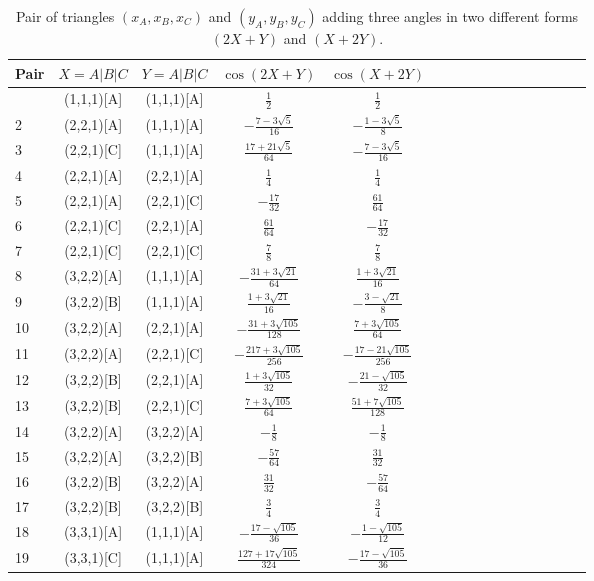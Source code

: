 \documentclass[11pt]{article}
\begin{document}
\begin{longtable}{ | p{1cm}| *{15}{c|} }
\caption{Pair of triangles $(x_A,x_B,x_C)$ and $(y_A,y_B,y_C)$ adding three angles 
in two different forms $(2X+Y)$ and $(X+2Y)$.}\\
\hline
Pair & $X = A | B | C$ & $Y = A | B | C$ & $\cos(2X+Y)$ & $\cos(X+2Y)$ \\
\hline\endhead
\hline\endfoot
1 & (1,1,1)[A] & (1,1,1)[A] & $\frac{1}{2}$ & $\frac{1}{2}$\\
2 & (2,2,1)[A] & (1,1,1)[A] & $-\frac{7-3\sqrt{5}}{16}$ & $-\frac{1-3\sqrt{5}}{8}$\\
3 & (2,2,1)[C] & (1,1,1)[A] & $\frac{17+21\sqrt{5}}{64}$ & $-\frac{7-3\sqrt{5}}{16}$\\
4 & (2,2,1)[A] & (2,2,1)[A] & $\frac{1}{4}$ & $\frac{1}{4}$\\
5 & (2,2,1)[A] & (2,2,1)[C] & $-\frac{17}{32}$ & $\frac{61}{64}$\\
6 & (2,2,1)[C] & (2,2,1)[A] & $\frac{61}{64}$ & $-\frac{17}{32}$\\
7 & (2,2,1)[C] & (2,2,1)[C] & $\frac{7}{8}$ & $\frac{7}{8}$\\
8 & (3,2,2)[A] & (1,1,1)[A] & $-\frac{31+3\sqrt{21}}{64}$ & $\frac{1+3\sqrt{21}}{16}$\\
9 & (3,2,2)[B] & (1,1,1)[A] & $\frac{1+3\sqrt{21}}{16}$ & $-\frac{3-\sqrt{21}}{8}$\\
10 & (3,2,2)[A] & (2,2,1)[A] & $-\frac{31+3\sqrt{105}}{128}$ & $\frac{7+3\sqrt{105}}{64}$\\
11 & (3,2,2)[A] & (2,2,1)[C] & $-\frac{217+3\sqrt{105}}{256}$ & $-\frac{17-21\sqrt{105}}{256}$\\
12 & (3,2,2)[B] & (2,2,1)[A] & $\frac{1+3\sqrt{105}}{32}$ & $-\frac{21-\sqrt{105}}{32}$\\
13 & (3,2,2)[B] & (2,2,1)[C] & $\frac{7+3\sqrt{105}}{64}$ & $\frac{51+7\sqrt{105}}{128}$\\
14 & (3,2,2)[A] & (3,2,2)[A] & $-\frac{1}{8}$ & $-\frac{1}{8}$\\
15 & (3,2,2)[A] & (3,2,2)[B] & $-\frac{57}{64}$ & $\frac{31}{32}$\\
16 & (3,2,2)[B] & (3,2,2)[A] & $\frac{31}{32}$ & $-\frac{57}{64}$\\
17 & (3,2,2)[B] & (3,2,2)[B] & $\frac{3}{4}$ & $\frac{3}{4}$\\
18 & (3,3,1)[A] & (1,1,1)[A] & $-\frac{17-\sqrt{105}}{36}$ & $-\frac{1-\sqrt{105}}{12}$\\
19 & (3,3,1)[C] & (1,1,1)[A] & $\frac{127+17\sqrt{105}}{324}$ & $-\frac{17-\sqrt{105}}{36}$\\

\end{longtable}
\end{document}
